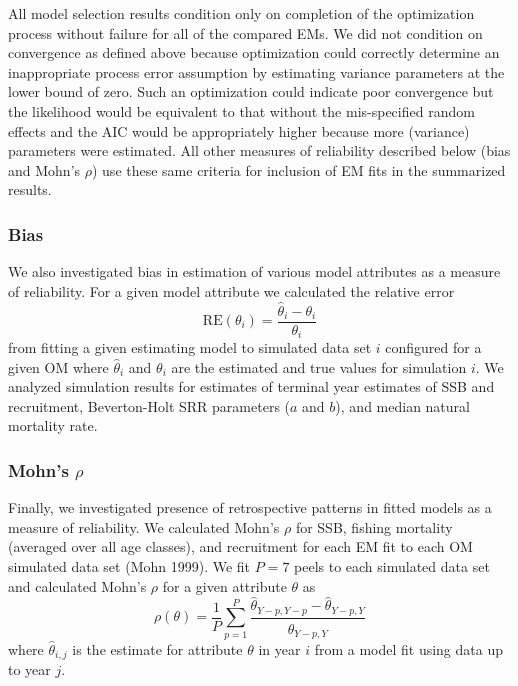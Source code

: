 \documentclass[
  12pt,
]{article}
\begin{document}
All model selection results condition only on completion of the
optimization process without failure for all of the compared EMs. We did
not condition on convergence as defined above because optimization could
correctly determine an inappropriate process error assumption by
estimating variance parameters at the lower bound of zero. Such an
optimization could indicate poor convergence but the likelihood would be
equivalent to that without the mis-specified random effects and the AIC
would be appropriately higher because more (variance) parameters were
estimated. All other measures of reliability described below (bias and
Mohn's \(\rho\)) use these same criteria for inclusion of EM fits in the
summarized results.

\subsubsection*{Bias}\label{bias}

We also investigated bias in estimation of various model attributes as a
measure of reliability. For a given model attribute we calculated the
relative error \begin{equation}\label{relerror}
\text{RE}\left(\theta_i\right) = \frac{\widehat \theta_i - \theta_i}{\theta_i}
\end{equation} from fitting a given estimating model to simulated data
set \(i\) configured for a given OM where \(\widehat \theta_i\) and
\(\theta_i\) are the estimated and true values for simulation \(i\). We
analyzed simulation results for estimates of terminal year estimates of
SSB and recruitment, Beverton-Holt SRR parameters (\(a\) and \(b\)), and
median natural mortality rate.

\subsubsection*{\texorpdfstring{Mohn's
\(\rho\)}{Mohn's \textbackslash rho}}\label{mohns-rho}

Finally, we investigated presence of retrospective patterns in fitted
models as a measure of reliability. We calculated Mohn's \(\rho\) for
SSB, fishing mortality (averaged over all age classes), and recruitment
for each EM fit to each OM simulated data set (Mohn 1999). We fit
\(P = 7\) peels to each simulated data set and calculated Mohn's
\(\rho\) for a given attribute \(\theta\) as
\begin{equation}\label{mohns_rho}
\rho\left(\theta\right) = \frac{1}{P}\sum^P_{p=1} \frac{\widehat \theta_{Y-p,Y-p} - \widehat\theta_{Y-p,Y}}{\widehat\theta_{Y-p,Y}}
\end{equation} where \(\widehat \theta_{i,j}\) is the estimate for
attribute \(\theta\) in year \(i\) from a model fit using data up to
year \(j\).
\end{document}
